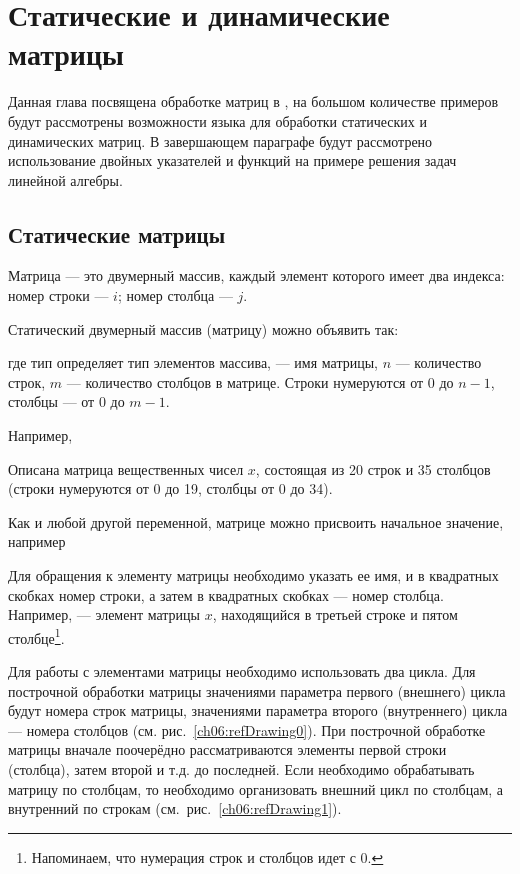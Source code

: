 \chapter[Статические и динамические матрицы]{Статические и динамические матрицы}\label{ch06}
Данная глава посвящена обработке матриц в , на большом количестве примеров будут рассмотрены возможности языка для
обработки статических и динамических матриц. В завершающем параграфе будут рассмотрено использование двойных указателей
и функций на примере решения задач линейной алгебры.

\section[Статические матрицы \Sys{С(С++)}]{Статические матрицы }
Матрица --- это двумерный массив, каждый элемент которого имеет два индекса: номер строки --- $i$; номер столбца --- $j$. 

Статический двумерный массив (матрицу) можно объявить так:


где тип определяет тип элементов массива,  --- имя матрицы, $n$ --- количество строк, $m$ --- количество столбцов в матрице. Строки нумеруются от 0 до $n-1$, столбцы --- от 0 до $m-1$.

Например, 


Описана матрица вещественных чисел $x$, состоящая из 20 строк и 35 столбцов 
(строки нумеруются от 0 до 19, столбцы от 0 до 34).

Как и любой другой переменной, матрице можно присвоить начальное значение, например 

Для обращения к элементу матрицы необходимо указать ее имя, и в квадратных скобках номер строки, а затем в квадратных
скобках --- номер столбца. Например,  --- элемент матрицы $x$, находящийся в третьей строке и пятом
столбце\footnote{Напоминаем, что нумерация строк и столбцов идет с 0.}.

Для работы с элементами матрицы необходимо использовать два цикла. Для построчной обработки матрицы значениями параметра
первого (внешнего) цикла будут номера строк матрицы, значениями параметра второго (внутреннего) цикла --- номера столбцов
(см. рис.~\ref{ch06:refDrawing0}). При построчной обработке матрицы вначале поочерёдно рассматриваются элементы первой
строки (столбца), затем второй и т.д. до последней. Если необходимо обрабатывать матрицу по столбцам, то необходимо
организовать внешний цикл по столбцам, а внутренний по строкам (см.~рис.~\ref{ch06:refDrawing1}).

